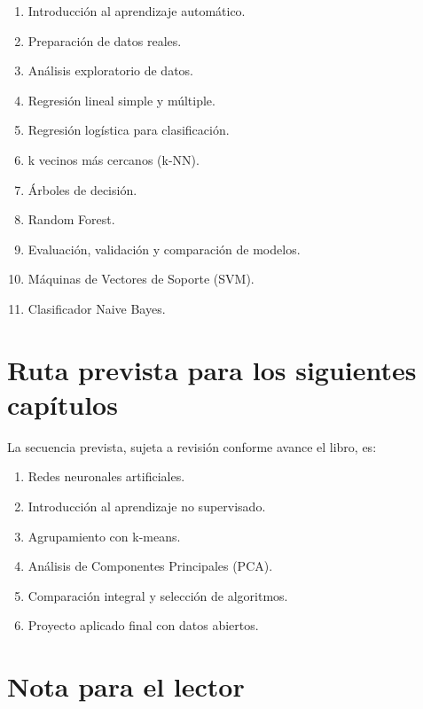 \documentclass[
  spanish,
  10.5pt,
  letterpaper,
  openany,
  headings=big]{scrbook}
\providecommand{\tightlist}{%
  \setlength{\itemsep}{0pt}\setlength{\parskip}{0pt}}
\begin{document}
\begin{enumerate}
\def\labelenumi{\arabic{enumi}.}
\tightlist
\item
  Introducción al aprendizaje automático.
\item
  Preparación de datos reales.
\item
  Análisis exploratorio de datos.
\item
  Regresión lineal simple y múltiple.
\item
  Regresión logística para clasificación.
\item
  k vecinos más cercanos (k-NN).
\item
  Árboles de decisión.
\item
  Random Forest.
\item
  Evaluación, validación y comparación de modelos.
\item
  Máquinas de Vectores de Soporte (SVM).
\item
  Clasificador Naive Bayes.
\end{enumerate}

\section*{Ruta prevista para los siguientes
capítulos}\label{ruta-prevista-para-los-siguientes-capuxedtulos}


La secuencia prevista, sujeta a revisión conforme avance el libro, es:

\begin{enumerate}
\def\labelenumi{\arabic{enumi}.}
\setcounter{enumi}{11}
\tightlist
\item
  Redes neuronales artificiales.
\item
  Introducción al aprendizaje no supervisado.
\item
  Agrupamiento con k-means.
\item
  Análisis de Componentes Principales (PCA).
\item
  Comparación integral y selección de algoritmos.
\item
  Proyecto aplicado final con datos abiertos.
\end{enumerate}

\section*{Nota para el lector}\label{nota-para-el-lector}
\end{document}
